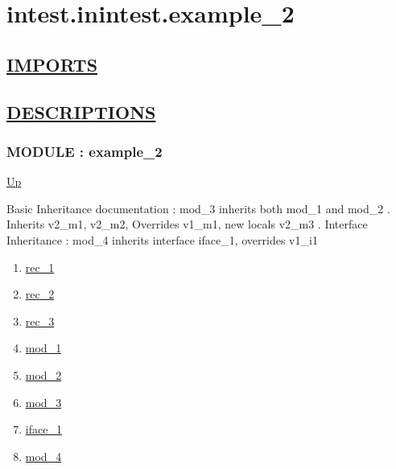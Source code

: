 \chapter*{intest.inintest.example\_2}
\hypertarget{ecldoc:toc:intest.inintest.example_2}{}

\section*{\underline{IMPORTS}}

\section*{\underline{DESCRIPTIONS}}
\subsection*{MODULE : example\_2}
\hypertarget{ecldoc:intest.inintest.example_2}{}
\par
\begin{minipage}[t]{\textwidth}
\begin{flushleft}
  
\end{flushleft}
\end{minipage}
\hyperlink{ecldoc:toc:intest/inintest}{Up} \\
\par
Basic Inheritance documentation : mod\_3 inherits both mod\_1 and mod\_2 . Inherits v2\_m1, v2\_m2, Overrides v1\_m1, new locals v2\_m3 . Interface Inheritance : mod\_4 inherits interface iface\_1, overrides v1\_i1 \\
\par
\begin{enumerate}
\item \hyperlink{ecldoc:intest.inintest.example_2.rec_1}{rec\_1}
\item \hyperlink{ecldoc:intest.inintest.example_2.rec_2}{rec\_2}
\item \hyperlink{ecldoc:intest.inintest.example_2.rec_3}{rec\_3}
\item \hyperlink{ecldoc:intest.inintest.example_2.mod_1}{mod\_1}
\item \hyperlink{ecldoc:intest.inintest.example_2.mod_2}{mod\_2}
\item \hyperlink{ecldoc:intest.inintest.example_2.mod_3}{mod\_3}
\item \hyperlink{ecldoc:intest.inintest.example_2.iface_1}{iface\_1}
\item \hyperlink{ecldoc:intest.inintest.example_2.mod_4}{mod\_4}
\end{enumerate}
